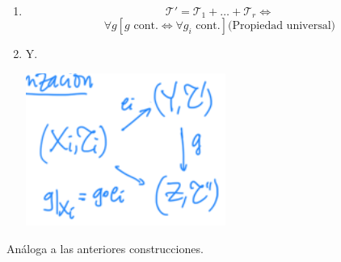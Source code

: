 \begin{theo}
\begin{enumerate}
    \item
    \[
    \mathcal{T}' = \mathcal{T}_1 + \ldots + \mathcal{T}_r \Leftrightarrow  
    \]
    \begin{equation}
        \forall g \left[ g \text{ cont.} \Leftrightarrow \forall g_i \text{ cont.} \right] \text{(Propiedad universal)} 
    \end{equation}

    \item Y.
    \begin{center}
        \includegraphics[scale=0.3]{images/caracterizacion_top_sum} 
    \end{center}
\end{enumerate}
\end{theo}
\begin{demo}
    Análoga a las anteriores construcciones.
\end{demo}

